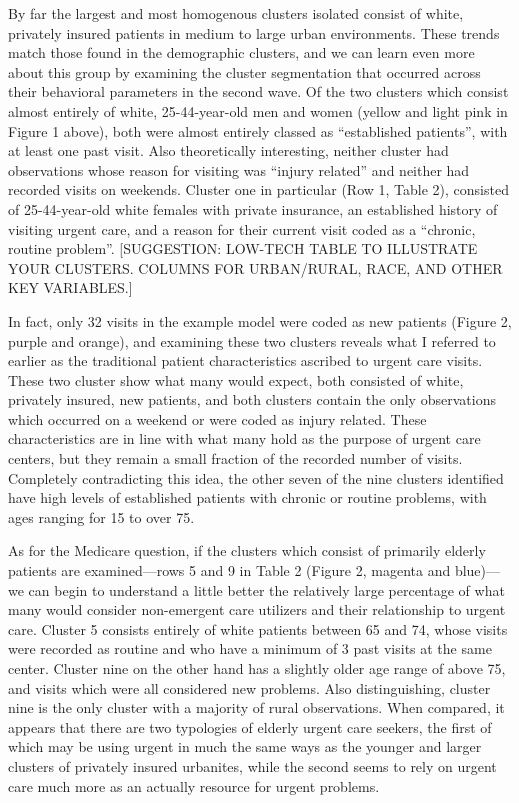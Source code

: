 \documentclass[12pt,twoside]{reedthesis}
\begin{document}
  By far the largest and most homogenous clusters isolated consist of
  white, privately insured patients in medium to large urban environments.
  These trends match those found in the demographic clusters, and we can
  learn even more about this group by examining the cluster segmentation
  that occurred across their behavioral parameters in the second wave. Of
  the two clusters which consist almost entirely of white, 25-44-year-old
  men and women (yellow and light pink in Figure 1 above), both were
  almost entirely classed as ``established patients'', with at least one
  past visit. Also theoretically interesting, neither cluster had
  observations whose reason for visiting was ``injury related'' and
  neither had recorded visits on weekends. Cluster one in particular (Row
  1, Table 2), consisted of 25-44-year-old white females with private
  insurance, an established history of visiting urgent care, and a reason
  for their current visit coded as a ``chronic, routine problem''.
  {[}SUGGESTION: LOW-TECH TABLE TO ILLUSTRATE YOUR CLUSTERS. COLUMNS FOR
  URBAN/RURAL, RACE, AND OTHER KEY VARIABLES.{]}
  
  In fact, only 32 visits in the example model were coded as new patients
  (Figure 2, purple and orange), and examining these two clusters reveals
  what I referred to earlier as the traditional patient characteristics
  ascribed to urgent care visits. These two cluster show what many would
  expect, both consisted of white, privately insured, new patients, and
  both clusters contain the only observations which occurred on a weekend
  or were coded as injury related. These characteristics are in line with
  what many hold as the purpose of urgent care centers, but they remain a
  small fraction of the recorded number of visits. Completely
  contradicting this idea, the other seven of the nine clusters identified
  have high levels of established patients with chronic or routine
  problems, with ages ranging for 15 to over 75.
  
  As for the Medicare question, if the clusters which consist of primarily
  elderly patients are examined---rows 5 and 9 in Table 2 (Figure 2,
  magenta and blue)---we can begin to understand a little better the
  relatively large percentage of what many would consider non-emergent
  care utilizers and their relationship to urgent care. Cluster 5 consists
  entirely of white patients between 65 and 74, whose visits were recorded
  as routine and who have a minimum of 3 past visits at the same center.
  Cluster nine on the other hand has a slightly older age range of above
  75, and visits which were all considered new problems. Also
  distinguishing, cluster nine is the only cluster with a majority of
  rural observations. When compared, it appears that there are two
  typologies of elderly urgent care seekers, the first of which may be
  using urgent in much the same ways as the younger and larger clusters of
  privately insured urbanites, while the second seems to rely on urgent
  care much more as an actually resource for urgent problems.
  
\end{document}
